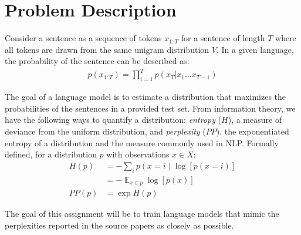 \documentclass[11pt]{article}
\DeclareMathOperator*{\E}{\mathbb{E}}
\begin{document}
\section{Problem Description}

Consider a sentence as a sequence of tokens $x_{1:T}$ for a sentence of length $T$ where all tokens are drawn from the same unigram distribution $V$. In a given language, the probability of the sentence can be described as:
\begin{align*}
  p(x_{1:T}) = \prod_{i=1}^{T} p(x_{T} | x_1 ... x_{T-1})
\end{align*}

The goal of a language model is to estimate a distribution that maximizes the probabilities of the sentences in a provided test set. From information theory, we have the following ways to quantify a distribution: \textit{entropy} ($H$), a measure of deviance from the uniform distribution, and \textit{perplexity} ($PP$), the exponentiated entropy of a distribution and the measure commonly used in NLP. Formally defined, for a distribution $p$ with observations $x \in X$:
\begin{align*}
  H(p) &= - \sum_{i} p(x=i) \log[p(x=i)] \\
       &= - \E_{x\in p} \log[p(x)] \\
  PP(p) &= \exp{H(p)} 
\end{align*}

The goal of this assignment will be to train language models that mimic the perplexities reported in the source papers as closely as possible.




\end{document}
